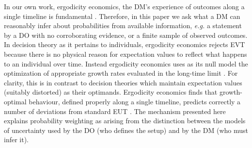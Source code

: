 \documentclass[a4paper, 12pt]{article}
\newcommand{\eg}{\textit{e.g.}\xspace}
\begin{document}

In our own work, ergodicity economics, the DM's experience of outcomes along a single timeline is fundamental \parencite{Peters2019b}. Therefore, in this paper we ask what a DM can reasonably infer about probabilities from available information, \eg a statement by a DO with no corroborating evidence, or a finite sample of observed outcomes. In decision theory as it pertains to individuals, ergodicity economics rejects EVT because there is no physical reason for expectation values to reflect what happens to an individual over time. Instead ergodicity economics uses as its null model the optimization of appropriate growth rates evaluated in the long-time limit \parencite{Peters2011a,Peters2011b,Peters2019b}. For clarity, this is in contrast to decision theories which maintain expectation values (suitably distorted) as their optimands. Ergodicity economics finds that growth-optimal behaviour, defined properly along a single timeline, predicts correctly a number of deviations from standard EUT \parencite{MederETAL2019,AdamouETAL2019,BermanKirstein2020}. The mechanism presented here explains probability weighting as arising from the distinction between the models of uncertainty used by the DO (who defines the setup) and by the DM (who must infer it).
\end{document}

